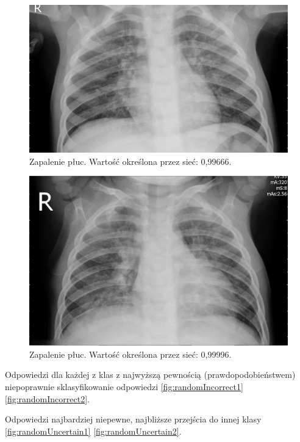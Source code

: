 \documentclass[12pt,a4paper,twoside,titlepage,openright]{book}
\begin{document}
\begin{figure}[ht]
	\centering
			\includegraphics[resolution=100, scale=0.3]{randomCertain3.png}
		\caption{Zapalenie płuc. Wartość określona przez sieć: 0,99666.}
				\label{fig:randomCertain3}
\end{figure}

\begin{figure}[ht]
	\centering
			\includegraphics[resolution=100, scale=0.3]{randomCertain4.png}
		\caption{Zapalenie płuc. Wartość określona przez sieć: 0,99996.}
				\label{fig:randomCertain4}
\end{figure}


Odpowiedzi dla każdej z klas z najwyższą pewnością (prawdopodobieństwem) niepoprawnie sklasyfikowanie odpowiedzi \ref{fig:randomIncorrect1} \ref{fig:randomIncorrect2}. 

Odpowiedzi najbardziej niepewne, najbliższe przejścia do innej klasy \ref{fig:randomUncertain1} \ref{fig:randomUncertain2}.
\end{document}
